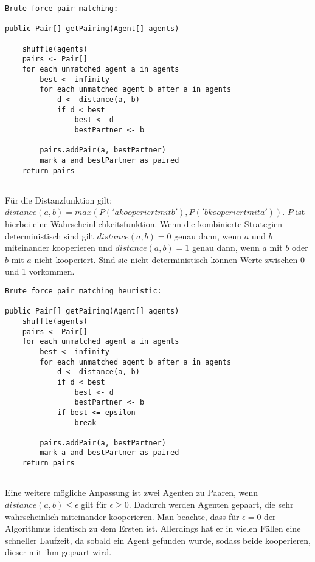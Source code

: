 \begin{lstlisting}
Brute force pair matching:

public Pair[] getPairing(Agent[] agents) 

	shuffle(agents)
	pairs <- Pair[]
	for each unmatched agent a in agents
		best <- infinity
		for each unmatched agent b after a in agents
			d <- distance(a, b)
			if d < best
				best <- d
				bestPartner <- b
				
		pairs.addPair(a, bestPartner)
		mark a and bestPartner as paired		
	return pairs	
	
\end{lstlisting}
Für die Distanzfunktion gilt: $distance(a, b) = max(P('a kooperiert mit b'), P('b kooperiert mit a'))$. $P$ ist hierbei eine Wahrscheinlichkeitsfunktion. Wenn die kombinierte Strategien deterministisch sind gilt $distance(a, b) = 0$ genau dann, wenn $a$ und $b$ miteinander kooperieren und $distance(a, b) = 1$ genau dann, wenn $a$ mit $b$ oder $b$ mit $a$ nicht kooperiert. Sind sie nicht deterministisch können Werte zwischen 0 und 1 vorkommen.

\begin{lstlisting}
Brute force pair matching heuristic:

public Pair[] getPairing(Agent[] agents) 
	shuffle(agents)
	pairs <- Pair[]
	for each unmatched agent a in agents
		best <- infinity
		for each unmatched agent b after a in agents
			d <- distance(a, b)			
			if d < best
				best <- d
				bestPartner <- b
			if best <= epsilon
				break			
						
		pairs.addPair(a, bestPartner)
		mark a and bestPartner as paired
	return pairs		
	
\end{lstlisting}
Eine weitere mögliche Anpassung ist zwei Agenten zu Paaren, wenn $distance(a, b) \leq \epsilon$ gilt für $\epsilon \geq 0$. Dadurch werden Agenten gepaart, die sehr wahrscheinlich miteinander kooperieren. Man beachte, dass für $\epsilon = 0$ der Algorithmus identisch zu dem Ersten ist. Allerdings hat er in vielen Fällen eine schneller Laufzeit, da sobald ein Agent gefunden wurde, sodass beide kooperieren, dieser mit ihm gepaart wird.
